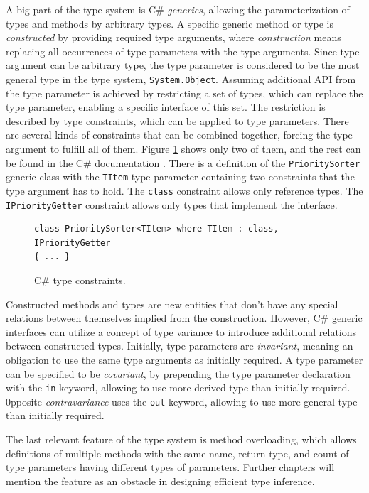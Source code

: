 \par
A big part of the type system is C\# \textit{generics}, allowing the parameterization of types and methods by arbitrary types. 
A specific generic method or type is \textit{constructed} by providing required type arguments, where \textit{construction} means replacing all occurrences of type parameters with the type arguments. 
Since type argument can be arbitrary type, the type parameter is considered to be the most general type in the type system, \texttt{System.Object}. 
Assuming additional API from the type parameter is achieved by restricting a set of types, which can replace the type parameter, enabling a specific interface of this set. 
The restriction is described by type constraints, which can be applied to type parameters. 
There are several kinds of constraints that can be combined together, forcing the type argument to fulfill all of them. 
Figure \ref{img05:typeConst} shows only two of them, and the rest can be found in the C\# documentation \cite{online:csharpTypeConst}. 
There is a definition of the \texttt{PrioritySorter} generic class with the \texttt{TItem} type parameter containing two constraints that the type argument has to hold. 
The \texttt{class} constraint allows only reference types. 
The \texttt{IPriorityGetter} constraint allows only types that implement the
interface.
\begin{figure}[h]
\begin{lstlisting}[style=csharp]
class PrioritySorter<TItem> where TItem : class, IPriorityGetter 
{ ... }
\end{lstlisting}
\caption{C\# type constraints.}
\label{img05:typeConst}
\end{figure}
\par
Constructed methods and types are new entities that don’t have any special relations between themselves implied from the construction. 
However, C\# generic interfaces can utilize a concept of type variance to introduce additional relations between constructed types. 
Initially, type parameters are \textit{invariant}, meaning an obligation to use the same type arguments as initially required. 
A type parameter can be specified to be \textit{covariant}, by prepending the type parameter declaration with the \texttt{in} keyword, allowing to use more derived type than initially required. 
0pposite \textit{contravariance} uses the \texttt{out} keyword, allowing to use
more general type than initially required.
\par
The last relevant feature of the type system is method overloading, which
allows definitions of multiple methods with the same name, return type, and count of type parameters having different types of parameters. 
Further chapters will mention the feature as an obstacle in designing efficient type inference.

